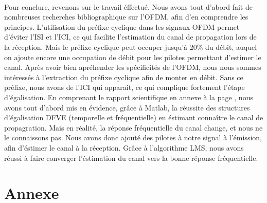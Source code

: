 \documentclass[a4paper, 11pt, oneside, oldfontcommands]{memoir}
\newcounter{th}[chapter]
\begin{document}
\paragraph{}
Pour conclure, revenons sur le travail éffectué. Nous avons tout d'abord fait de nombreuses recherches bibliographique sur l'OFDM, afin d'en comprendre les principes. L'utilisation du préfixe cyclique dans les signaux OFDM permet d'éviter l'ISI et l'ICI, ce qui facilite l'estimation du canal de propagation lors de la réception. Mais le préfixe cyclique peut occuper jusqu'à 20\% du débit, auquel on ajoute encore une occupation de débit pour les pilotes permettant d'estimer le canal. Après avoir bien apréhender les spécificités de l'OFDM, nous nous sommes intéressés à l'extraction du préfixe cyclique afin de monter en débit. Sans ce préfixe, nous avons de l'ICI qui apparait, ce qui complique fortement l'étape d'égalisation. En comprenant le rapport scientifique \cite{sujet} en annexe à la page \pageref{annexe}, nous avons tout d'abord mis en évidence, grâce à Matlab, la réussite des structures d'égalisation DFVE (temporelle et fréquentielle) en éstimant connaître le canal de propagration. Mais en réalité, la réponse fréquentielle du canal change, et nous ne le connaissons pas. Nous avons donc ajouté des pilotes à notre signal à l'émission, afin d'éstimer le canal à la réception. Grâce à l'algorithme LMS, nous avons réussi à faire converger l'éstimation du canal vers la bonne réponse fréquentielle. 






\newpage


\part*{Annexe}
\label{annexe}
\appendix
\nocite{*}

\newpage
 \listoffigures
 \printindex
 
  
\end{document}

